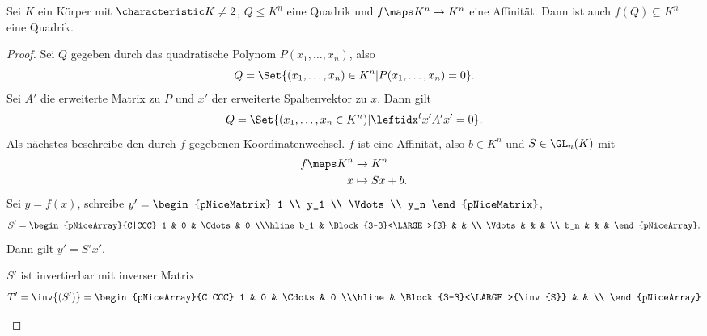 \begin{lemma}\label{affinitaet_bildet_quadriken_auf_quadriken_ab}
  Sei \( K \) ein Körper mit \( \characteristic K\neq2 \), \( Q\leq K^n \) eine Quadrik und \( f\maps K^n\to K^n \) eine Affinität. Dann ist auch \( f(Q)\subseteq K^n \) eine Quadrik.
\end{lemma}
\begin{proof}
  Sei \( Q \) gegeben durch das quadratische Polynom \( P(x_1,\dotsc, x_n) \), also
  \begin{equation*}
    Q=\Set{(x_1,\dotsc,x_n)\in K^n|P(x_1,\dotsc,x_n)=0}.
  \end{equation*}
  Sei \( A' \) die erweiterte Matrix zu \( P \) und \( x' \) der erweiterte Spaltenvektor zu \( x \). Dann gilt
  \begin{align*}
    Q=\Set{(x_1,\dotsc,x_n\in K^n)|\transpose{x'}A'x'=0}.
  \end{align*}
  Als nächstes beschreibe den durch \( f \) gegebenen Koordinatenwechsel. \( f \) ist eine Affinität, also \texists \( b\in K^n \) und \( S\in \GL_n(K) \) mit
  \begin{equation*}
    \begin{split}
      f\maps K^n&\to K^n\\
      x&\mapsto Sx+b.
    \end{split}
  \end{equation*}
  Sei \( y=f(x) \), schreibe \( y'=\begin{pNiceMatrix} 1 \\ y_1 \\ \Vdots \\ y_n \end{pNiceMatrix} \),
  \begin{equation*}
    S'=\begin{pNiceArray}{C|CCC}
      1 & 0 & \Cdots & 0 \\\hline
      b_1 & \Block{3-3}<\LARGE>{S} &  & \\
      \Vdots & & & \\
      b_n & & &
    \end{pNiceArray}.
  \end{equation*}
  Dann gilt \( y'=S'x' \).
  \begin{bemerkung*}
    \( S' \) ist invertierbar mit inverser Matrix
    \begin{equation*}
      T'=\inv{(S')}=\begin{pNiceArray}{C|CCC}
        1 & 0 & \Cdots & 0 \\\hline
         & \Block{3-3}<\LARGE>{\inv{S}} &  & \\

\end{pNiceArray}
\end{equation*}
\end{bemerkung*}
\end{proof}
